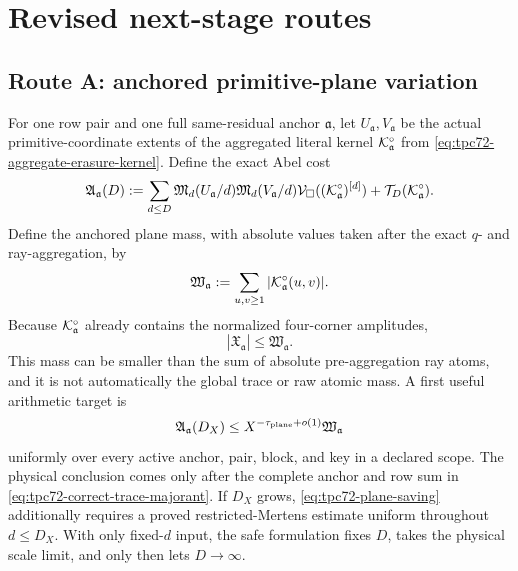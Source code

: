 \section{Revised next-stage routes}
\label{sec:revised-routes}

\subsection{Route A: anchored primitive-plane variation}

For one row pair and one full same-residual anchor \(\mathfrak a\), let
\(U_{\mathfrak a},V_{\mathfrak a}\) be the actual primitive-coordinate
extents of the aggregated literal kernel
\(\mathcal K_{\mathfrak a}^{\circ}\) from
\eqref{eq:tpc72-aggregate-erasure-kernel}.  Define the exact Abel cost
\begin{equation}
 \mathfrak A_{\mathfrak a}(D)
 :=
 \sum_{d\le D}
 \mathfrak M_d(U_{\mathfrak a}/d)
 \mathfrak M_d(V_{\mathfrak a}/d)
 \mathcal V_\square((\mathcal K_{\mathfrak a}^{\circ})^{[d]})
 +
 \mathcal T_D(\mathcal K_{\mathfrak a}^{\circ}).
 \label{eq:tpc72-Abel-cost}
\end{equation}
Define the anchored plane mass, with absolute values taken after the exact
\(q\)- and ray-aggregation, by
\begin{equation}
 \mathfrak W_{\mathfrak a}
 :=
 \sum_{u,v\ge1}
 |\mathcal K_{\mathfrak a}^{\circ}(u,v)|.
 \label{eq:tpc72-anchored-plane-mass}
\end{equation}
Because \(\mathcal K_{\mathfrak a}^{\circ}\) already contains the normalized
four-corner amplitudes,
\[
 |\mathfrak X_{\mathfrak a}|
 \le
 \mathfrak W_{\mathfrak a}.
\]
This mass can be smaller than the sum of absolute pre-aggregation ray
atoms, and it is not automatically the global trace or raw atomic mass.
A first useful arithmetic target is
\begin{equation}
 \mathfrak A_{\mathfrak a}(D_X)
 \le
 X^{-\tau_{\rm plane}+o(1)}\mathfrak W_{\mathfrak a}
 \label{eq:tpc72-plane-saving}
\end{equation}
uniformly over every active anchor, pair, block, and key in a declared
scope.  The physical conclusion comes only after the complete anchor and
row sum in \eqref{eq:tpc72-correct-trace-majorant}.
If \(D_X\) grows, \eqref{eq:tpc72-plane-saving} additionally requires a
proved restricted-Mertens estimate uniform throughout \(d\le D_X\).
With only fixed-\(d\) input, the safe formulation fixes \(D\), takes the
physical scale limit, and only then lets \(D\to\infty\).


